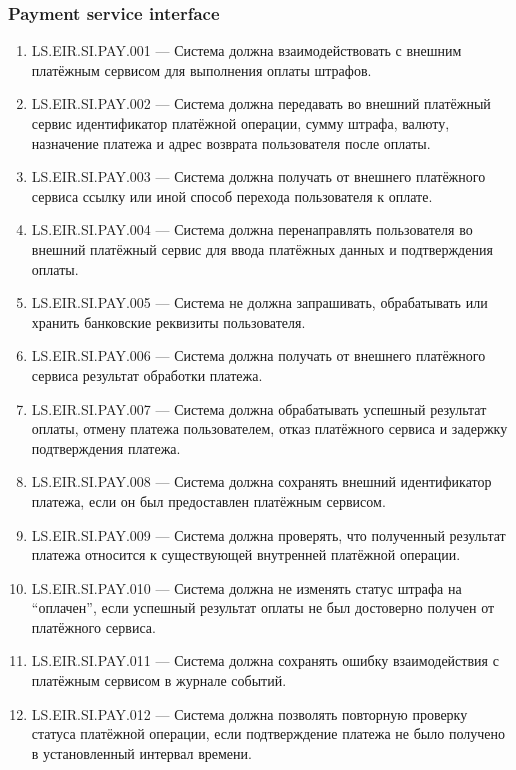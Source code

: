 \documentclass[12pt,a4paper]{article}
\begin{document}
	\subsubsection{Payment service interface}
	
	\begin{enumerate}
		\item LS.EIR.SI.PAY.001 --- Система должна взаимодействовать с внешним платёжным
		сервисом для выполнения оплаты штрафов.
		
		\item LS.EIR.SI.PAY.002 --- Система должна передавать во внешний платёжный сервис
		идентификатор платёжной операции, сумму штрафа, валюту, назначение платежа
		и адрес возврата пользователя после оплаты.
		
		\item LS.EIR.SI.PAY.003 --- Система должна получать от внешнего платёжного сервиса
		ссылку или иной способ перехода пользователя к оплате.
		
		\item LS.EIR.SI.PAY.004 --- Система должна перенаправлять пользователя во внешний
		платёжный сервис для ввода платёжных данных и подтверждения оплаты.
		
		\item LS.EIR.SI.PAY.005 --- Система не должна запрашивать, обрабатывать или хранить
		банковские реквизиты пользователя.
		
		\item LS.EIR.SI.PAY.006 --- Система должна получать от внешнего платёжного сервиса
		результат обработки платежа.
		
		\item LS.EIR.SI.PAY.007 --- Система должна обрабатывать успешный результат оплаты,
		отмену платежа пользователем, отказ платёжного сервиса и задержку подтверждения
		платежа.
		
		\item LS.EIR.SI.PAY.008 --- Система должна сохранять внешний идентификатор платежа,
		если он был предоставлен платёжным сервисом.
		
		\item LS.EIR.SI.PAY.009 --- Система должна проверять, что полученный результат
		платежа относится к существующей внутренней платёжной операции.
		
		\item LS.EIR.SI.PAY.010 --- Система должна не изменять статус штрафа на
		``оплачен'', если успешный результат оплаты не был достоверно получен от
		платёжного сервиса.
		
		\item LS.EIR.SI.PAY.011 --- Система должна сохранять ошибку взаимодействия
		с платёжным сервисом в журнале событий.
		
		\item LS.EIR.SI.PAY.012 --- Система должна позволять повторную проверку статуса
		платёжной операции, если подтверждение платежа не было получено в установленный
		интервал времени.
	\end{enumerate}
	
\end{document}
